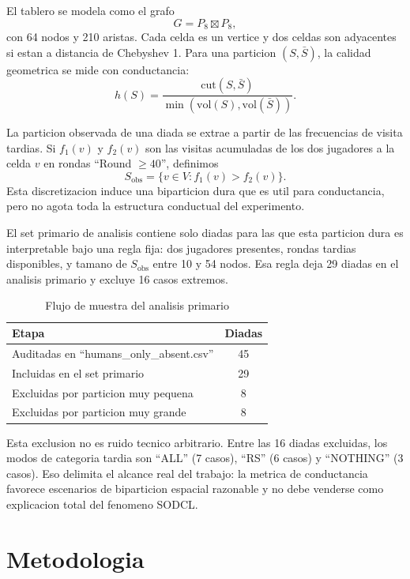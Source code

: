 \documentclass[conference]{IEEEtran}
\newcommand{\vol}{\mathrm{vol}}
\newcommand{\cut}{\mathrm{cut}}
\newcommand{\Sobs}{S_{\mathrm{obs}}}
\begin{document}
El tablero se modela como el grafo
\[
G = P_8 \boxtimes P_8,
\]
con 64 nodos y 210 aristas. Cada celda es un vertice y dos celdas son adyacentes si estan a distancia de Chebyshev 1. Para una particion $(S,\bar S)$, la calidad geometrica se mide con conductancia:
\begin{equation}
h(S)=\frac{\cut(S,\bar S)}{\min(\vol(S),\vol(\bar S))}.
\end{equation}

La particion observada de una diada se extrae a partir de las frecuencias de visita tardias. Si $f_1(v)$ y $f_2(v)$ son las visitas acumuladas de los dos jugadores a la celda $v$ en rondas ``Round $\geq 40$'', definimos
\begin{equation}
\Sobs = \{v \in V : f_1(v) > f_2(v)\}.
\end{equation}
Esta discretizacion induce una biparticion dura que es util para conductancia, pero no agota toda la estructura conductual del experimento.

El set primario de analisis contiene solo diadas para las que esta particion dura es interpretable bajo una regla fija: dos jugadores presentes, rondas tardias disponibles, y tamano de $\Sobs$ entre 10 y 54 nodos. Esa regla deja 29 diadas en el analisis primario y excluye 16 casos extremos.

\begin{table}[t]
\caption{Flujo de muestra del analisis primario}
\label{tab:flow}
\centering
\begin{tabular}{|l|c|}
\hline
Etapa & Diadas \\
\hline
Auditadas en ``humans\_only\_absent.csv'' & 45 \\
Incluidas en el set primario & 29 \\
Excluidas por particion muy pequena & 8 \\
Excluidas por particion muy grande & 8 \\
\hline
\end{tabular}
\end{table}

Esta exclusion no es ruido tecnico arbitrario. Entre las 16 diadas excluidas, los modos de categoria tardia son ``ALL'' (7 casos), ``RS'' (6 casos) y ``NOTHING'' (3 casos). Eso delimita el alcance real del trabajo: la metrica de conductancia favorece escenarios de biparticion espacial razonable y no debe venderse como explicacion total del fenomeno SODCL.

\section{Metodologia}
\end{document}
